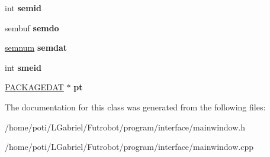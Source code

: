 \begin{DoxyCompactItemize}
\item 
int {\bfseries semid}\hypertarget{classMainWindow_abb7ef4ea7fef62149fc0fbc550466202}{}\label{classMainWindow_abb7ef4ea7fef62149fc0fbc550466202}

\item 
sembuf {\bfseries semdo}\hypertarget{classMainWindow_ae2fd03e62c31125263f8e95fedefd5a7}{}\label{classMainWindow_ae2fd03e62c31125263f8e95fedefd5a7}

\item 
\hyperlink{unionsemnum}{semnum} {\bfseries semdat}\hypertarget{classMainWindow_a255b691e54e2775cb40f07badd1bae5d}{}\label{classMainWindow_a255b691e54e2775cb40f07badd1bae5d}

\item 
int {\bfseries smeid}\hypertarget{classMainWindow_ae024c34cd5c5a7a919c57668306eb7a9}{}\label{classMainWindow_ae024c34cd5c5a7a919c57668306eb7a9}

\item 
\hyperlink{structPACKAGEDAT}{P\+A\+C\+K\+A\+G\+E\+D\+AT} $\ast$ {\bfseries pt}\hypertarget{classMainWindow_a605a92cd5b85a3731fc1f7bc1c67e505}{}\label{classMainWindow_a605a92cd5b85a3731fc1f7bc1c67e505}

\end{DoxyCompactItemize}


The documentation for this class was generated from the following files\+:\begin{DoxyCompactItemize}
\item 
/home/poti/\+L\+Gabriel/\+Futrobot/program/interface/mainwindow.\+h\item 
/home/poti/\+L\+Gabriel/\+Futrobot/program/interface/mainwindow.\+cpp\end{DoxyCompactItemize}
